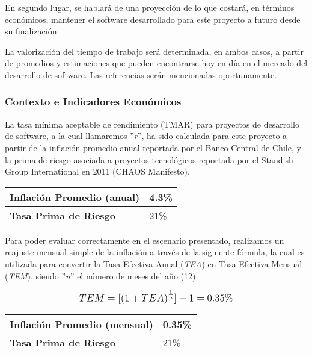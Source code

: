 En segundo lugar, se hablará de una proyección de lo que costará, en términos económicos, mantener el software desarrollado para este proyecto a futuro desde su finalización.

La valorización del tiempo de trabajo será determinada, en ambos casos, a partir de promedios y estimaciones que pueden encontrarse hoy en día en el mercado del desarrollo de software. Las referencias serán mencionadas oportunamente.

\subsubsection{Contexto e Indicadores Económicos}
\label{feasibility:economic:context}
La tasa mínima aceptable de rendimiento (TMAR) para proyectos de desarrollo de software, a la cual llamaremos ''\textit{r}'', ha sido calculada para este proyecto a partir de la inflación promedio anual reportada por el Banco Central de Chile, y la prima de riesgo asociada a proyectos tecnológicos reportada por el Standish Group International en 2011 (CHAOS Manifesto).

\begin{center}
	\begin{tabular}{ | p{7cm} | p{5cm}|}
		\hline
		{\textbf{Inflación Promedio (anual)}} & 4.3\%  \\ \hline
		{\textbf{Tasa Prima de Riesgo}} & 21\% \\ \hline
	\end{tabular}
\end{center}

Para poder evaluar correctamente en el escenario presentado, realizamos un reajuste mensual simple de la inflación a través de la siguiente fórmula, la cual es utilizada para convertir la Tasa Efectiva Anual (\textit{TEA}) en Tasa Efectiva Mensual (\textit{TEM}), siendo ''\textit{n}'' el número de meses del año (12).

\[
\mathlarger{
	TEM = [\left(1 + TEA\right)^\frac{1}{n}] - 1 = 0.35\%
}
\]

\begin{center}
	\begin{tabular}{ | p{7cm} | p{5cm}|}
		\hline
		{\textbf{Inflación Promedio (mensual)}} & 0.35\%  \\ \hline
		{\textbf{Tasa Prima de Riesgo}} & 21\% \\ \hline
	\end{tabular}
\end{center}

